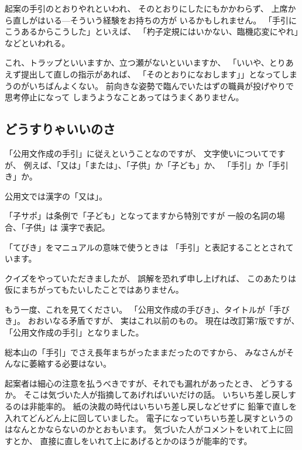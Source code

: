 \documentclass[uplatex,jis2004,dvipdfmx,12pt]{jsarticle}
\begin{document}
起案の手引のとおりやれといわれ、
そのとおりにしたにもかかわらず、
上席から直しがはいる---そういう経験をお持ちの方が
いるかもしれません。
「手引にこうあるからこうした」といえば、
「杓子定規にはいかない、臨機応変にやれ」などといわれる。

これ、トラップといいますか、立つ瀬がないといいますか、
「いいや、とりあえず提出して直しの指示があれば、
「そのとおりになおします」」となってしまうのがいちばんよくない。
前向きな姿勢で臨んでいたはずの職員が投げやりで思考停止になって
しまうようなことあってはうまくありません。

\subsection{どうすりゃいいのさ}


「公用文作成の手引」に従えということなのですが、
文字使いについてですが、
例えば、「又は」「または」、「子供」か「子ども」か、
「手引」か「手引き」か。


公用文では漢字の「又は」。

「子サポ」は条例で「子ども」となってますから特別ですが
一般の名詞の場合、「子供」は
漢字で表記。



「てびき」をマニュアルの意味で使うときは
「手引」と表記することとされています。

クイズをやっていただきましたが、
誤解を恐れず申し上げれば、
このあたりは
仮にまちがってもたいしたことではありません。

もう一度、これを見てください。
「公用文作成の手びき」、タイトルが「手びき」。
おおいなる矛盾ですが、
実はこれ以前のもの。
現在は改訂第7版ですが、
「公用文作成の手引」となりました。




総本山の「手引」でさえ長年まちがったままだったのですから、
みなさんがそんなに萎縮する必要はない。


起案者は細心の注意を払うべきですが、それでも漏れがあったとき、
どうするか。
そこは気づいた人が指摘してあげればいいだけの話。
いちいち差し戻しするのは非能率的。
紙の決裁の時代はいちいち差し戻しなどせずに
鉛筆で直しを入れてどんどん上に回していました。
電子になっていちいち差し戻すというのはなんとかならないのかとおもいます。
気づいた人がコメントをいれて上に回すとか、
直接に直しをいれて上にあげるとかのほうが能率的です。


\end{document}
